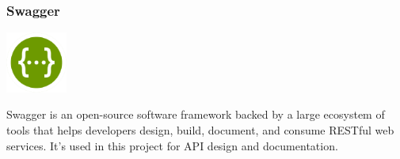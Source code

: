 \subsubsection{Swagger}

\begin{center}
\includegraphics[width=0.15\textwidth]{Images/logos/Swagger-logo.png}
\label{fig:swagger}
\end{center}
Swagger is an open-source software framework backed by a large ecosystem of tools that helps developers design, build, document, and consume RESTful web services. It’s used in this project for API design and documentation.
